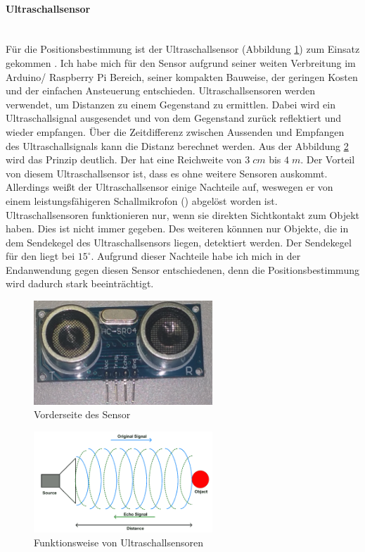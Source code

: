 \paragraph{Ultraschallsensor}\mbox{}\\
Für die Positionsbestimmung ist der Ultraschallsensor \ultraschall \platz (Abbildung \ref{img:ultraschallsensor}) zum Einsatz gekommen \cite{src_HC_SR04}. Ich habe mich für den \ultraschall \platz Sensor aufgrund seiner weiten Verbreitung im Arduino/ Raspberry Pi Bereich, seiner kompakten Bauweise, der geringen Kosten und der einfachen Ansteuerung entschieden. Ultraschallsensoren werden verwendet, um Distanzen zu einem Gegenstand zu ermittlen. Dabei wird ein Ultraschallsignal ausgesendet und von dem Gegenstand zurück reflektiert und wieder empfangen. Über die Zeitdifferenz zwischen Aussenden und Empfangen des Ultraschallsignals kann die Distanz berechnet werden. Aus der Abbildung \ref{img:ultraschall_prinzip} wird das Prinzip deutlich. Der \ultraschall \platz  hat eine Reichweite von $3\; cm$ bis $4\;m$. Der Vorteil von diesem Ultraschallsensor ist, dass es ohne weitere Sensoren auskommt. Allerdings weißt der Ultraschallsensor einige Nachteile auf, weswegen er von einem leistungsfähigeren Schallmikrofon (\microphone) abgelöst worden ist. Ultraschallsensoren funktionieren nur, wenn sie direkten Sichtkontakt zum Objekt haben. Dies ist nicht immer gegeben. Des weiteren könnnen nur Objekte, die in dem Sendekegel des Ultraschallsensors liegen, detektiert werden. Der Sendekegel für den \ultraschall \platz liegt bei $15^\circ$. Aufgrund dieser Nachteile habe ich mich in der Endanwendung gegen diesen Sensor entschiedenen, denn die Positionsbestimmung wird dadurch stark beeinträchtigt.
\begin{figure}[!ht]
        \centering
        \includegraphics[width=0.6\textwidth]{images/ultraschallsensor.png}
        \caption{Vorderseite des \ultraschall \platz Sensor}
        \label{img:ultraschallsensor}
\end{figure}
\begin{figure}[!ht]
        \centering
        \includegraphics[width=0.6\textwidth]{images/ultraschall_prinzip.png}
        \caption{Funktionsweise von Ultraschallsensoren}
        \label{img:ultraschall_prinzip}
\end{figure}

